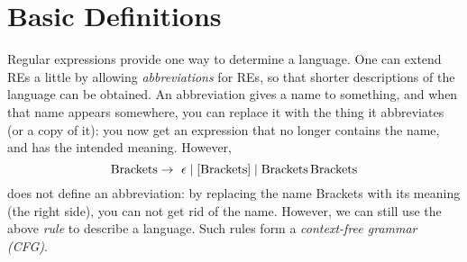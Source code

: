 \section{Basic Definitions}

Regular expressions provide one way to determine a language. One can
extend REs a little by allowing {\em abbreviations} for REs, so that
shorter descriptions of the language can be obtained. An abbreviation
gives a name to something, and when that name appears somewhere, you
can replace it with the thing it abbreviates (or a copy of it):
you now get an expression that no longer contains the name, and
has the intended meaning. However,
\begin{equation*}
	\text{Brackets} \rightarrow~ \epsilon \mid [\text{Brackets}] \mid \text{Brackets}\,\text{Brackets}
\end{equation*}
does not define an abbreviation: by replacing the name Brackets with
its meaning (the right side), you can not get rid of the
name. However, we can still use the above {\em rule} to describe a
language. Such rules form a {\em context-free grammar (CFG)}.

